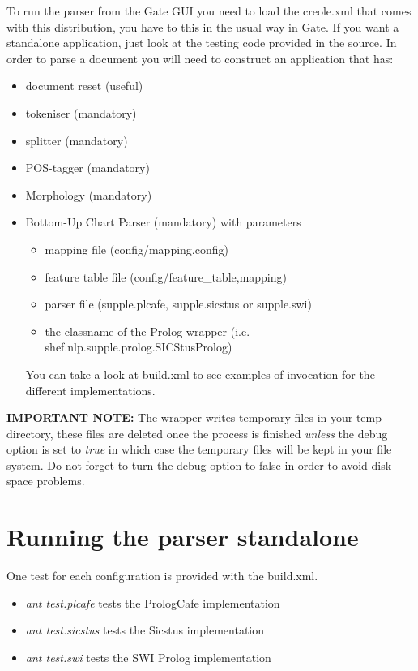 \documentclass[a4paper,titlepage,openany,twoside]{book}
\begin{document}
To run the parser from the Gate GUI you need to load the creole.xml
that comes with this distribution, you have to this in the usual way
in Gate. If you want  a standalone application, just look at the
testing code provided in the source. In order to parse a document you will
need to construct an application that has:

\begin{itemize}
\item document reset (useful)

\item tokeniser (mandatory)

\item splitter (mandatory)

\item POS-tagger (mandatory)

\item Morphology (mandatory)

\item Bottom-Up Chart Parser (mandatory) with parameters
\begin{itemize}
\item mapping file (config/mapping.config)
\item feature table file (config/feature\_table,mapping)
\item parser file (supple.plcafe, supple.sicstus or supple.swi)
\item the classname of the Prolog wrapper (i.e. shef.nlp.supple.prolog.SICStusProlog)
\end{itemize}
You can take a look at build.xml to see examples of invocation for
the different implementations.

\end{itemize} 

{\bf IMPORTANT NOTE:} The wrapper writes temporary files
in your temp directory, these files are deleted once the
process is finished {\em unless} the debug option is set to {\em true}
in which case the temporary files will be kept in your file system.
Do not forget to  turn the debug option to false in order to avoid 
disk space problems.

\chapter{Running the parser standalone}

One test for each configuration is provided with the build.xml. 

\begin{itemize}

\item {\em ant test.plcafe} tests the PrologCafe implementation

\item {\em ant test.sicstus} tests the Sicstus implementation

\item {\em ant test.swi} tests the SWI Prolog implementation


\end{itemize}
\end{document}

